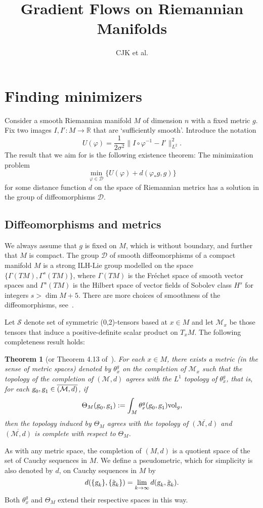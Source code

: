 \documentclass{article}
\title{Gradient Flows on Riemannian Manifolds}
\author{CJK et al.}
\theoremstyle{plain}
\newtheorem{teo}{Theorem}[section]
\theoremstyle{definition}
\numberwithin{equation}{section}
\newcommand{\R}{\ensuremath{\mathbb{R}}}
\newcommand{\g}{\ensuremath{\textsl{g}}}
\newcommand{\Vol}{\ensuremath{\mathrm{vol}}}
\newcommand{\cD}{\ensuremath{\mathcal{D}}}
\newcommand{\cM}{\ensuremath{\mathcal{M}}}
\newcommand{\cS}{\ensuremath{\mathcal{S}}}
\begin{document}
\section*{Finding minimizers}
Consider a smooth Riemannian manifold $M$ of dimension $n$ with a fixed metric $g$. Fix two images $I,I':M\to\R$ that are `sufficiently smooth'. Introduce the notation
\[
U(\varphi)= \frac{1}{2\sigma^2}\|I\circ \varphi^{-1}-I'\|^2_{L^2}.
\]
The result that we aim for is the following existence theorem: The minimization problem
\[
\min_{\varphi\in \cD}\{ U(\varphi)+d(\varphi_*g,g)\}
\]
for some distance function $d$ on the space of Riemannian metrics has a solution in the group of diffeomorphisms $\cD$. 

\subsection*{Diffeomorphisms and metrics}
We always assume that $g$ is fixed on $M$, which is without boundary, and further that $M$ is compact. The group $\cD$ of smooth diffeomorphisms of a compact manifold $M$ is a strong ILH-Lie group modelled on the space $\{\Gamma(TM),\Gamma^s(TM)\}$, where $\Gamma(TM)$ is the Fréchet space of smooth vector spaces and $\Gamma^s(TM)$ is the Hilbert space of vector fields of
Sobolev class $H^s$ for integers $s>\dim M +5$. There are more choices of smoothness of the diffeomorphisms, see~\cite{smolentsev2007spaces}. 

Let $\cS$ denote set of symmetric (0,2)-tensors based at $x\in M$ and let $\cM_x$ be those tensors that induce a positive-definite scalar product on $T_xM$. The following completeness result holds: 

\begin{teo}[{or Theorem 4.13 of~\cite{clarke2010riemannian}}]
For each $x\in M$, there exists a metric (in the sense of metric spaces) denoted by $\theta_x^g$ on the completion of $\cM_x$ such that the topology of the completion of $(\cM,d)$ agrees with the $L^1$ topology of $\theta_x^g$, that is, for each $\g_0,\g_1\in \overline{(\cM,d)}$, if
\[
\Theta_M(\g_0,\g_1):=\int_M \theta_x^g(\g_0,\g_1)\Vol_g,
\]
then the topology induced by $\Theta_M$ agrees with the topology of $\overline{(\cM,d)}$ and $\overline{(\cM,d)}$ is complete with respect to $\Theta_M$.
\end{teo}

As with any metric space, the completion of $(M,d)$ is a quotient space of the set of Cauchy sequences in $M$. We define a pseudometric, which for simplicity is also denoted by $d$, on Cauchy sequences in $M$ by 
\[
d(\{\g_k\},\{\tilde{\g}_k\})=\lim_{k\to\infty} d(\g_k,\tilde{\g}_k).
\]
Both $\theta_x^g$ and $\Theta_M$ extend their respective spaces in this way.
\end{document}
